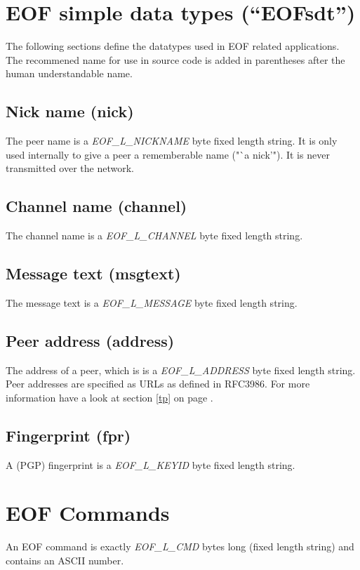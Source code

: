 \documentclass[12pt,a4paper]{book}
\begin{document}
\section{EOF simple data types ("`EOFsdt"')}
The following sections define the datatypes used in EOF related
applications. The recommened name for use in source
code is added in parentheses after the human understandable name.
\subsection{Nick name (nick)}
The peer name is a \emph{EOF\_L\_NICKNAME} byte fixed length string.
It is only used internally to give a peer a rememberable name ("`a nick'").
It is never transmitted over the network.
\subsection{Channel name (channel)}
The channel name is a \emph{EOF\_L\_CHANNEL} byte fixed length string.
\subsection{Message text (msgtext)}
The message text is a \emph{EOF\_L\_MESSAGE} byte fixed length string.
\subsection{Peer address (address)}
The address of a peer, which is is a \emph{EOF\_L\_ADDRESS}
byte fixed length string. Peer addresses are specified as
URLs as defined in RFC3986\cite{uri-1}. For more information have
a look at section \ref{tp} on page \pageref{tp}.
\subsection{Fingerprint (fpr)}
A (PGP) fingerprint is a \emph{EOF\_L\_KEYID} byte fixed length string.
\section{EOF Commands}
An EOF command is exactly \emph{EOF\_L\_CMD} bytes long (fixed length string)
and contains an ASCII number.
\end{document}
